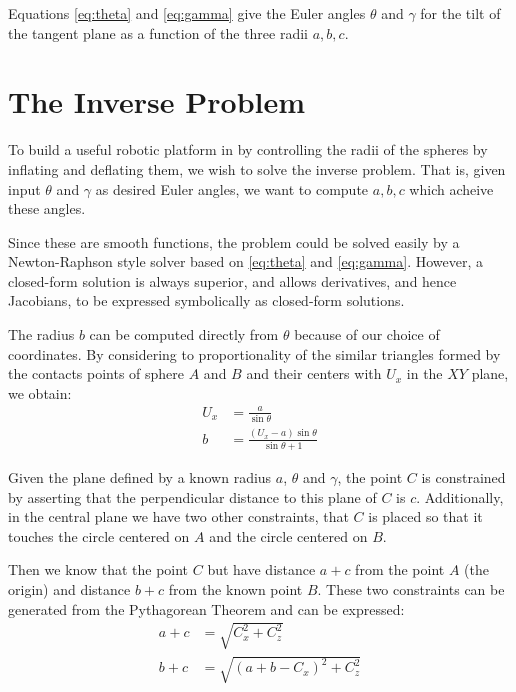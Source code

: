 \documentclass{article}
\begin{document}
Equations \ref{eq:theta} and \ref{eq:gamma} give the Euler angles
$\theta$ and $\gamma$
for the tilt of the
tangent plane as a function of the three radii $a,b,c$.


\section{The Inverse Problem}

To build a useful robotic platform in by controlling the radii of the
spheres by inflating and deflating them, we wish to solve the inverse
problem. That is, given input $\theta$ and $\gamma$ as desired Euler
angles, we want to compute $a,b,c$ which acheive these angles.

Since these are smooth functions, the problem could be solved
easily by a Newton-Raphson style solver based on \ref{eq:theta} and \ref{eq:gamma}.
However, a closed-form solution is always superior, and allows derivatives,
and hence Jacobians, to be expressed symbolically as closed-form solutions.

The radius $b$ can be computed directly from $\theta$
because of our choice of coordinates.
By considering to proportionality of the similar triangles formed
by the contacts points of sphere $A$ and $B$ and their centers with $U_x$ in the $XY$ plane,
we obtain:
\begin{align}
  U_x &= \frac{a}{\sin{\theta}} \\
  b &= \frac{(U_x - a)\sin{\theta}}{\sin{\theta}+1}
\end{align}

\newcommand{\abs}[1]{ \left\lvert#1\right\rvert}

Given the plane defined by a known radius $a$, $\theta$ and $\gamma$,
the point $C$ is constrained by asserting that the perpendicular
distance to this plane of $C$ is $c$.
Additionally, in the central plane we have two other constraints,
that $C$ is placed so that it touches the circle centered on $A$ and
the circle centered on $B$.

Then we know that the point $C$ but have distance $a+c$ from
the point $A$ (the origin) and distance $b+c$ from the known
point $B$. These two constraints can be generated from the Pythagorean Theorem and can be expressed:
\begin{align}
a + c &= \sqrt{C_x^2 + C_z ^2} \label{eq:a_constraint}\\
b + c &= \sqrt{(a+b-C_x)^2 + C_z^2} \label{eq:b_constraint}
\end{align}
\end{document}
